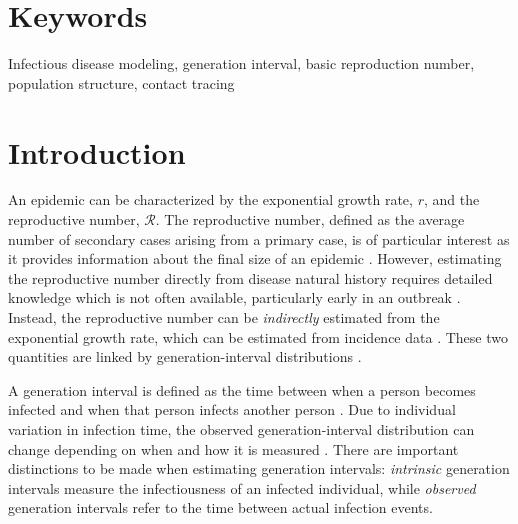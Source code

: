 \documentclass[12pt]{article}
\newcommand{\RR}{\ensuremath{{\mathcal R}}}
\begin{document}
\section*{Keywords}

Infectious disease modeling, generation interval, basic reproduction number, population structure, contact tracing

\pagebreak

\section{Introduction}

An epidemic can be characterized by the exponential growth rate, $r$, and the reproductive number, \RR.
The reproductive number, defined as the average number of secondary cases arising from a primary case, is of particular interest as it provides information about the final size of an epidemic \citep{anderson1991infectious, diekmann1990definition}.
However, estimating the reproductive number directly from disease natural history requires detailed knowledge which is not often available, particularly early in an outbreak \citep{dietz1993estimation}.
Instead, the reproductive number can be \emph{indirectly} estimated from the exponential growth rate, which can be estimated from incidence data \citep{chowell2003sars, mills2004transmissibility, nishiura2009transmission, nishiura2010pros, ma2014estimating}.
These two quantities are linked by generation-interval distributions \citep{wearing2005appropriate, svensson2007note, roberts2007model, wallinga2007generation, park2019practical}.

A generation interval is defined as the time between when a person becomes infected and when that person infects another person \citep{svensson2007note}.
Due to individual variation in infection time, the observed generation-interval distribution can change depending on when and how it is measured \citep{svensson2007note, kenah2008generation, nishiura2010time, champredon2015intrinsic}.
There are important distinctions to be made when estimating generation intervals: \emph{intrinsic} generation intervals measure the infectiousness of an infected individual,
while \emph{observed} generation intervals refer to the time between actual infection events.
\end{document}
